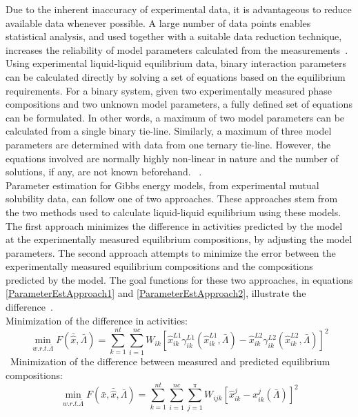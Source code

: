 Due to the inherent inaccuracy of experimental data, it is advantageous to reduce available data whenever possible. A large number of data points enables statistical analysis, and used together with a suitable data reduction technique, increases the reliability of model parameters calculated from the measurements~\cite{EvaluationModelParameters, ActivityCoefficientModelApplicationUNI, ActivityCoefficientModelApplicationNRTL}.\\

Using experimental liquid-liquid equilibrium data, binary interaction parameters can be calculated directly by solving a set of equations based on the equilibrium requirements. For a binary system, given two experimentally measured phase compositions and two unknown model parameters, a fully defined set of equations can be formulated. In other words, a maximum of two model parameters can be calculated from a single binary tie-line. Similarly, a maximum of three model parameters are determined with data from one ternary tie-line. However, the equations involved are normally highly non-linear in nature and the number of solutions, if any, are not known beforehand. ~\cite{LLECorrelation, ReliableComputationBinaryParams}.\\ 

Parameter estimation for Gibbs energy models, from experimental mutual solubility data, can follow one of two approaches. These approaches stem from the two methods used to calculate liquid-liquid equilibrium using these models. The first approach minimizes the difference in activities predicted by the model at the experimentally measured equilibrium compositions, by adjusting the model parameters. The second approach attempts to minimize the error between the experimentally measured equilibrium compositions and the compositions predicted by the model. The goal functions for these two approaches, in equations \ref{ParameterEstApproach1} and \ref{ParameterEstApproach2}, illustrate the difference~\cite{LLECorrelation}.\\

Minimization of the difference in activities:\
\begin{equation}
\min_{w.r.t. \bar{\Lambda}} F\left(\bar{\hat{x}}, \bar{\Lambda}\right) = \sum_{k=1}^{nt}\sum_{i=1}^{nc} W_{ik}\left[\hat{x}_{ik}^{L1}\gamma_{ik}^{L1}\left(\hat{x}_{ik}^{L1}, \bar{\Lambda}\right) - \hat{x}_{ik}^{L2}\gamma_{ik}^{L2}\left(\hat{x}_{ik}^{L2}, \bar{\Lambda}\right)\right]^{2} \label{ParameterEstApproach1}
\end{equation}\
Minimization of the difference between measured and predicted equilibrium compositions:\
\begin{equation}
\min_{w.r.t. \bar{\Lambda}} F\left(\bar{x}, \bar{\hat{x}}, \bar{\Lambda}\right) = \sum_{k=1}^{nt}\sum_{i=1}^{nc}\sum_{j=1}^{\pi} W_{ijk} \left[\hat{x}_{ik}^{j}-x_{ik}^{j}\left(\bar{\Lambda} \right)\right]^{2} \label{ParameterEstApproach2}
\end{equation}\

